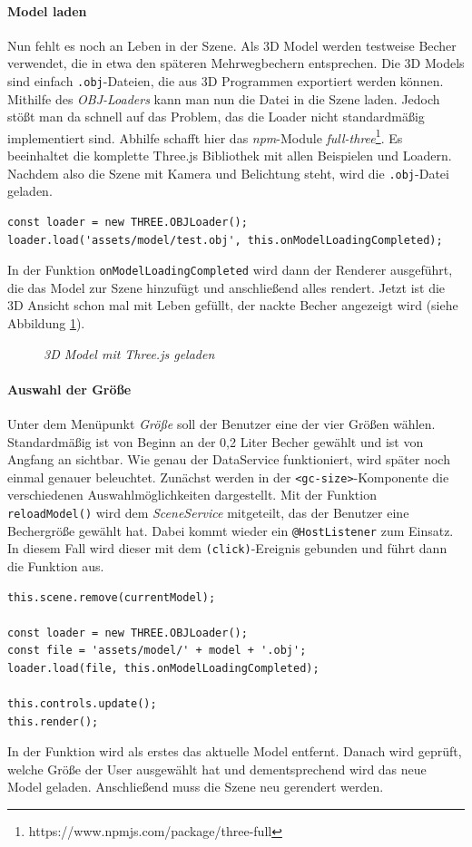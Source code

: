 \paragraph{Model laden} Nun fehlt es noch an Leben in der Szene. Als 3D Model werden testweise Becher verwendet, die in etwa den späteren Mehrwegbechern entsprechen. Die 3D Models sind einfach \texttt{.obj}-Dateien, die aus 3D Programmen exportiert werden können. Mithilfe des \textit{OBJ-Loaders} kann man nun die Datei in die Szene laden. Jedoch stößt man da schnell auf das Problem, das die Loader nicht standardmäßig implementiert sind. Abhilfe schafft hier das \textit{npm}-Module \textit{full-three}\footnote{https://www.npmjs.com/package/three-full}. Es beeinhaltet die komplette Three.js Bibliothek mit allen Beispielen und Loadern. Nachdem also die Szene mit Kamera und Belichtung steht, wird die \texttt{.obj}-Datei geladen.
%
\begin{lstlisting}[caption={Laden des Models mit dem OBJLoader},label=lst:objloader]
const loader = new THREE.OBJLoader();
loader.load('assets/model/test.obj', this.onModelLoadingCompleted);
\end{lstlisting}
%
In der Funktion \texttt{onModelLoadingCompleted} wird dann der Renderer ausgeführt, die das Model zur Szene hinzufügt und anschließend alles rendert. Jetzt ist die 3D Ansicht schon mal mit Leben gefüllt, der nackte Becher angezeigt wird (siehe Abbildung \ref{fig:model3d}).
\begin{figure}[h]
	\centering
	{}
	\caption[3D Becher Model]{\textit{3D Model mit Three.js geladen}}
	\label{fig:model3d}
\end{figure}
\paragraph{Auswahl der Größe}
Unter dem Menüpunkt \textit{\glqq Größe\grqq} soll der Benutzer eine der vier Größen wählen. Standardmäßig ist von Beginn an der 0,2 Liter Becher gewählt und ist von Angfang an sichtbar. Wie genau der DataService funktioniert, wird später noch einmal genauer beleuchtet. Zunächst werden in der \texttt{<gc-size>}-Komponente die verschiedenen Auswahlmöglichkeiten dargestellt. Mit der Funktion \texttt{reloadModel()} wird dem \textit{SceneService} mitgeteilt, das der Benutzer eine Bechergröße gewählt hat. Dabei kommt wieder ein \texttt{@HostListener} zum Einsatz. In diesem Fall wird dieser mit dem \texttt{(click)}-Ereignis gebunden und führt dann die Funktion aus.
%
\begin{lstlisting}[caption={Ausschnitt der reloadModel()-Funktion},label=lst:reloadmodel]
this.scene.remove(currentModel);

const loader = new THREE.OBJLoader();
const file = 'assets/model/' + model + '.obj';
loader.load(file, this.onModelLoadingCompleted);

this.controls.update();
this.render();
\end{lstlisting}
%
In der Funktion wird als erstes das aktuelle Model entfernt. Danach wird geprüft, welche Größe der User ausgewählt hat und dementsprechend wird das neue Model geladen. Anschließend muss die Szene neu gerendert werden. 
